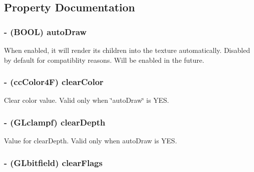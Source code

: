 \subsection{Property Documentation}
\hypertarget{class_c_c_render_texture_a74d13404d368796b39f69f320faee52b}{
\subsubsection[{auto\-Draw}]{\setlength{\rightskip}{0pt plus 5cm}-\/ (B\-O\-O\-L) {\bf auto\-Draw}}}\label{class_c_c_render_texture_a74d13404d368796b39f69f320faee52b}
When enabled, it will render its children into the texture automatically. Disabled by default for compatiblity reasons. Will be enabled in the future. \hypertarget{class_c_c_render_texture_acd634a88dca082fc15cec37b06aac438}{
\subsubsection[{clear\-Color}]{\setlength{\rightskip}{0pt plus 5cm}-\/ ({\bf cc\-Color4\-F}) {\bf clear\-Color}}}\label{class_c_c_render_texture_acd634a88dca082fc15cec37b06aac438}
Clear color value. Valid only when \char`\"{}auto\-Draw\char`\"{} is Y\-E\-S. \hypertarget{class_c_c_render_texture_af79356a17a6760f9f6167d5444cf6b77}{
\subsubsection[{clear\-Depth}]{\setlength{\rightskip}{0pt plus 5cm}-\/ (G\-Lclampf) {\bf clear\-Depth}}}\label{class_c_c_render_texture_af79356a17a6760f9f6167d5444cf6b77}
Value for clear\-Depth. Valid only when auto\-Draw is Y\-E\-S. \hypertarget{class_c_c_render_texture_af0a421c5fee6668cbfbb8386d002af41}{
\subsubsection[{clear\-Flags}]{\setlength{\rightskip}{0pt plus 5cm}-\/ (G\-Lbitfield) {\bf clear\-Flags}}}\label{class_c_c_render_texture_af0a421c5fee6668cbfbb8386d002af41}
